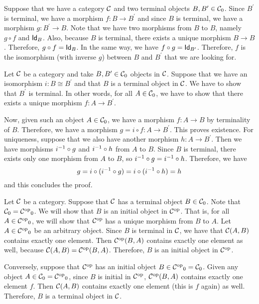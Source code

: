\begin{solution}\label{sol:terminal-unique}
	Suppose that we have a category $ \CC $ and two terminal objects $ B, B^\prime \in \Ob\CC $. Since $ B^\prime $ is terminal, we have a morphism $ f: B \to B^\prime $ and since $ B $ is terminal, we have a morphism $ g: B^\prime \to B $. Note that we have two morphisms from $ B $ to $ B $, namely $ g \circ f $ and $ \Id[B] $. Also, because $ B $ is terminal, there exists a unique morphism $ B \to B $. Therefore, $ g \circ f = \Id[B] $. In the same way, we have $ f \circ g = \Id[B^\prime] $. Therefore, $ f $ is the isomorphism (with inverse $g$) between $ B $ and $ B^\prime $ that we are looking for.
\end{solution}

\begin{solution}\label{sol:terminality_preserved_by_iso}
	Let $ \CC $ be a category and take $ B, B^\prime \in \Ob\CC $ objects in $ \CC $. Suppose that we have an isomorphism $ i: B \cong B^\prime $ and that $ B $ is a terminal object in $ \CC $. We have to show that $ B^\prime $ is terminal. In other words, for all $ A \in \Ob\CC $, we have to show that there exists a unique morphism $ f: A \to B^\prime $.

	Now, given such an object $ A \in \Ob\CC $, we have a morphism $ f: A \to B $ by terminality of $ B $. Therefore, we have a morphism $ g = i \circ f: A \to B^\prime $. This proves existence. For uniqueness, suppose that we also have another morphism $ h: A \to B^\prime $. Then we have morphisms $ \Inv{i} \circ g $ and $ \Inv{i} \circ h $ from $ A $ to $ B $. Since $ B $ is terminal, there exists only one morphism from $ A $ to $ B $, so $ \Inv{i} \circ g = \Inv{i} \circ h $. Therefore, we have 
	\[ g = i \circ (\Inv{i} \circ g) = i \circ (\Inv i \circ h) = h \]
	and this concludes the proof.
\end{solution}

\begin{solution}\label{sol:terminal_iff_initial_op}
  Let $ \CC $ be a category. Suppose that $ \CC $ has a terminal object $ B \in \Ob\CC $. Note that $ \Ob\CC = \Ob{\op\CC} $. We will show that $ B $ is an initial object in $ \op\CC $. That is, for all $ A \in \Ob{\op\CC} $, we will show that $ \op\CC $ has a unique morphism from $ B $ to $ A $.
  Let $ A \in \Ob{\op\CC} $ be an arbitrary object. Since $ B $ is terminal in $ \CC $, we have that $ \CC(A, B) $ contains exactly one element. Then $ \op\CC(B, A) $ contains exactly one element as well, because $ \CC(A, B) = \op\CC(B, A) $. Therefore, $ B $ is an initial object in $ \op\CC $.
  
  Conversely, suppose that $ \op\CC $ has an initial object $ B \in \Ob{\op\CC} = \Ob\CC $. Given any object $ A \in \Ob\CC = \Ob{\op\CC}  $, since $ B $ is initial in $ \op\CC $, $ \op\CC(B, A) $ contains exactly one element $ f $. Then $ \CC(A, B) $ contains exactly one element (this is $ f $ again) as well. Therefore, $ B $ is a terminal object in $ \CC $.
\end{solution}

